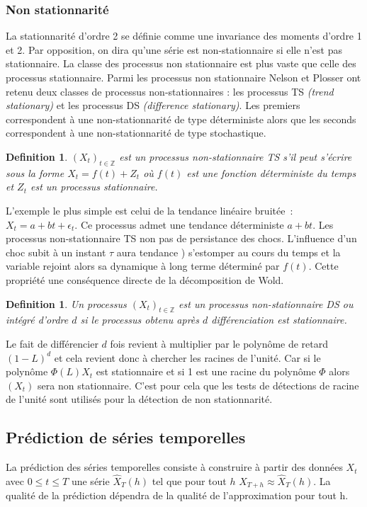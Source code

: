\documentclass[11pt]{scrartcl} %
\newtheorem{Def}[theorem]{Definition}
\newcommand{\Xt}{\left(X_t\right)_{t\in\mathbb{Z}}}
\begin{document}
\subsubsection{Non stationnarité}
La stationnarité d'ordre 2 se définie comme une invariance des moments d'ordre 1 et 2. Par opposition, on dira qu'une série est non-stationnaire si elle n'est pas stationnaire. La classe des processus non stationnaire est plus vaste que celle des processus stationnaire. Parmi les processus non stationnaire Nelson et Plosser \cite{NonSta} ont retenu deux classes de processus non-stationnaires : les processus TS \textit{(trend stationary)} et les processus DS \textit{(difference stationary)}. Les premiers correspondent à une non-stationnarité de type déterministe alors que les seconds correspondent à une non-stationnarité de type stochastique.
\begin{Def}
$\Xt$ est un processus non-stationnaire TS s'il peut s'écrire sous la forme $X_t = f(t)+Z_t$ où $f(t)$ est une fonction déterministe du temps et $Z_t$ est un processus stationnaire.
\end{Def}
L'exemple le plus simple est celui de la tendance linéaire bruitée~:~$X_t=a+bt+\epsilon_t$. Ce processus admet une tendance déterministe $a+bt$. Les processus non-stationnaire TS non pas de persistance des chocs. L'influence d'un choc subit à un instant $\tau$ aura tendance ) s'estomper au cours du temps et la variable rejoint alors sa dynamique à long terme déterminé par $f(t)$. Cette propriété une conséquence directe de la décomposition de Wold.
\begin{Def}
Un processus $\Xt$ est un processus non-stationnaire DS ou intégré d'ordre $d$ si le processus obtenu après $d$ différenciation est stationnaire.
\end{Def}
Le fait de différencier $d$ fois revient à multiplier par le polynôme de retard $(1-L)^d$ et cela revient donc à chercher les racines de l'unité. Car si le polynôme $\Phi(L)X_t$ est stationnaire et si 1 est une racine du polynôme $\Phi$ alors $\left(X_t\right)$ sera non stationnaire. C'est pour cela que les tests de détections de racine de l'unité sont utilisés pour la détection de non stationnarité.


\subsection{Prédiction de séries temporelles}
La prédiction des séries temporelles consiste à construire à partir des données $X_t$ avec $0\leq t\leq T$ une série $\hat{X}_T(h)$ tel que pour tout $h$ $X_{T+h}\approx \hat{X}_T(h)$. La qualité de la prédiction dépendra de la qualité de l'approximation pour tout h.
\end{document}
